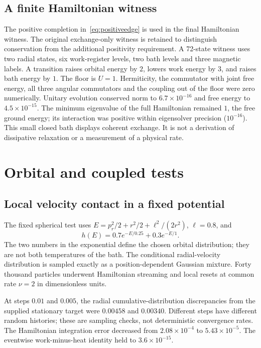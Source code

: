 \documentclass[11pt]{article}
\begin{document}
\subsection{A finite Hamiltonian witness}
The positive completion in~\eqref{eq:positiveedge} is used in the final
Hamiltonian witness. The original exchange-only witness is retained to
distinguish conservation from the additional positivity requirement.
A 72-state witness uses two radial states, six work-register levels, two
bath levels and three magnetic labels. A transition raises orbital energy
by $2$, lowers work energy by $3$, and raises bath energy by $1$. The
floor is $U=1$. Hermiticity, the commutator with joint free energy, all
three angular commutators and the coupling out of the floor were zero
numerically. Unitary evolution conserved norm to $6.7\times10^{-16}$ and
free energy to $4.5\times10^{-15}$. The minimum eigenvalue of the full
Hamiltonian remained $1$, the free ground energy; its interaction was
positive within eigensolver precision ($10^{-16}$).
This small closed bath displays coherent exchange. It is not a derivation
of dissipative relaxation or a measurement of a physical rate.

\section{Orbital and coupled tests}
\subsection{Local velocity contact in a fixed potential}
The fixed spherical test uses
$E=p_r^2/2+r^2/2+\ell^2/(2r^2)$, $\ell=0.8$, and
\begin{equation}
 h(E)=0.7e^{-E/0.25}+0.3e^{-E/1}.
\end{equation}
The two numbers in the exponential define the chosen orbital distribution;
they are not both temperatures of the bath. The conditional radial-velocity
distribution is sampled exactly as a position-dependent Gaussian mixture.
Forty thousand particles underwent Hamiltonian streaming and local resets
at common rate $\nu=2$ in dimensionless units.

At steps $0.01$ and $0.005$, the radial cumulative-distribution discrepancies
from the supplied stationary target were $0.00458$ and $0.00340$.
Different steps have different random histories; these are sampling checks,
not deterministic convergence rates. The Hamiltonian integration error
decreased from $2.08\times10^{-4}$ to $5.43\times10^{-5}$. The eventwise
work-minus-heat identity held to $3.6\times10^{-15}$.
\end{document}
